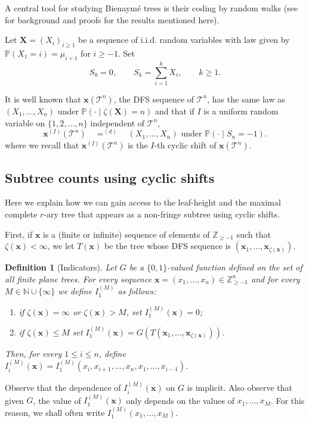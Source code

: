 \documentclass[a4paper,11pt]{article}
\newtheorem{definition}[theorem]{Definition}
\DeclareRobustCommand{\P}{\mathbb{P}}
\DeclareRobustCommand{\1}{\mathbf{1}}
\newcommand{\T}{\mathcal{T}}
\newcommand{\N}{\mathbb{N}}
\begin{document}
A central tool for studying Bienaym\'e trees is their coding by random walks (see \cite[Sec.~6.1]{Pit06} for background and proofs for the results mentioned here).  


Let $\mathbf{X}=(X_i)_{i \geq 1}$ be a sequence of i.i.d. random variables with law given by $\P(X_{1}=i)=\mu_{i+1}$ for $i \geq -1$. Set
$$S_0 = 0, \qquad S_k = \sum_{i=1}^k X_i, \qquad k \geq 1.$$

It is  well known  that $\mathbf{x}( \mathcal{T}^{n}) $, the DFS sequence of $\T^{n}$, has the same law as $(X_{1}, \ldots,X_{n}) $ under $ \P(\cdot \mid \zeta(\mathbf{X})=n) $ and that 
 if $I$ is a uniform random variable on $ \{1,2, \ldots,n\}$ independent of $ \mathcal{T}^{n}$, 
\begin{equation}
\label{eq:shifts}
\mathbf{x}^{(I)} ( \mathcal{T}^{n}) \quad  \mathop{=}^{(d)} \quad  (X_{1}, \ldots,X_{n}) \textrm{ under } \P(\cdot \mid S_{n}=-1).
\end{equation}
where we recall that $\mathbf{x}^{(I)} ( \mathcal{T}^{n})$ is the $I$-th cyclic shift of $\mathbf{x}( \mathcal{T}^{n}) $.



\subsection{Subtree counts using cyclic shifts}
\label{sec:indicators}

Here we explain how we can gain access to the leaf-height and the maximal complete $r$-ary tree that appears as a non-fringe subtree using cyclic shifts.

First, if $\mathbf{x}$ is a (finite or infinite) sequence of elements of  $\mathbb{Z}_{\geq -1}$ such that $\zeta(\mathbf{x})<\infty$, we let $T(\mathbf{x})$ be the tree whose DFS sequence is $(\mathbf{x}_{1}, \ldots,\mathbf{x}_{\zeta(\mathbf{x})})$.


\begin{definition}[Indicators]
\label{def:indicators}
Let $G$ be a $ \{0,1\}$-valued function defined on the set of all finite plane trees. 
For every  sequence $\mathbf{x}=(x_1, \ldots, x_n) \in \mathbb{Z}_{\geq -1} ^{n}$ and for every $M \in \N \cup \{\infty\}$ we define $I_1^{(M)}$ as follows:
\begin{enumerate}
\item[--] if $\zeta(\mathbf{x})=\infty$ or $\zeta(\mathbf{x})>M$, set $I_1^{(M)}(\mathbf{x}) = 0$;
\item[--] if  $\zeta(\mathbf{x}) \leq M$ set $I_1^{(M)}(\mathbf{x})=G(T(\mathbf{x}_{1}, \ldots,\mathbf{x}_{\zeta(\mathbf{x})}))$.
\end{enumerate}
Then, for every $1 \leq i \leq  n$, define $I_i^{(M)}(\mathbf{x}) =I^{(M)}_{1}(x_i, x_{i+1}, \ldots, x_n, x_1, \ldots, x_{i-1})$.
\end{definition}
 Observe that the dependence of $I_i^{(M)}(\mathbf{x})$ on $G$ is implicit. Also observe that given $G$, the value of $I_1^{(M)}(\mathbf{x})$ only depends on the values of $x_{1},  \ldots,x_{M}$. For this reason, we shall often write $I_1^{(M)}(x_{1}, \ldots,x_{M})$.
\end{document}
